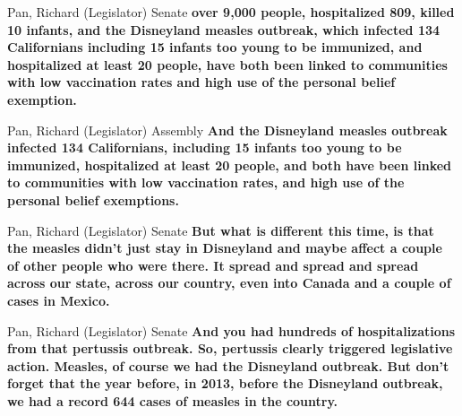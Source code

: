 \begin{result}{9.254614233689319}{Pan, Richard (Legislator) Senate}
\textbf{over 9,000 people, hospitalized 809, killed 10 infants, and the Disneyland measles outbreak, which infected 134 Californians including 15 infants too young to be immunized, and hospitalized at least 20 people, have both been linked to communities with low vaccination rates and high use of the personal belief exemption.
}\end{result}

\begin{result}{9.160509493034045}{Pan, Richard (Legislator) Assembly}
\textbf{And the Disneyland measles outbreak infected 134 Californians, including 15 infants too young to be immunized, hospitalized at least 20 people, and both have been linked to communities with low vaccination rates, and high use of the personal belief exemptions.
}\end{result}

\begin{result}{9.14432800842489}{Pan, Richard (Legislator) Senate}
\textbf{But what is different this time, is that the measles didn't just stay in Disneyland and maybe affect a couple of other people who were there. It spread and spread and spread across our state, across our country, even into Canada and a couple of cases in Mexico.
}\end{result}

\begin{result}{8.860327542507141}{Pan, Richard (Legislator) Senate}
\textbf{And you had hundreds of hospitalizations from that pertussis outbreak. So, pertussis clearly triggered legislative action. Measles, of course we had the Disneyland outbreak. But don't forget that the year before, in 2013, before the Disneyland outbreak, we had a record 644 cases of measles in the country.
}\end{result}

